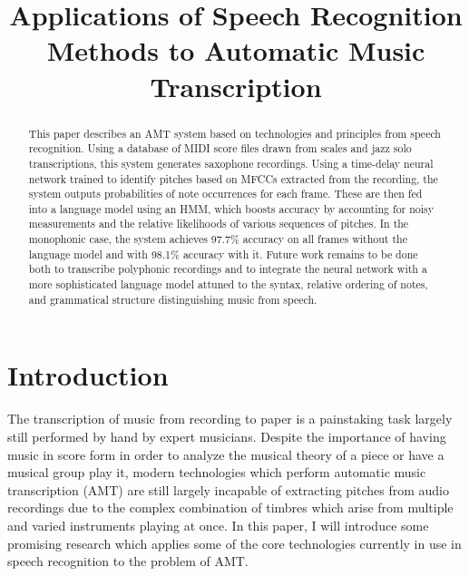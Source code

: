 \documentclass[conference]{IEEEtran}
\begin{document}
\title{Applications of Speech Recognition Methods to Automatic Music Transcription\\
}

\author{
}

\maketitle

\begin{abstract}
This paper describes an AMT system based on technologies and principles from speech recognition. Using a database of MIDI score files drawn from scales and jazz solo transcriptions, this system generates saxophone recordings. Using a time-delay neural network trained to identify pitches based on MFCCs extracted from the recording, the system outputs probabilities of note occurrences for each frame. These are then fed into a language model using an HMM, which boosts accuracy by accounting for noisy measurements and the relative likelihoods of various sequences of pitches. In the monophonic case, the system achieves 97.7\% accuracy on all frames without the language model and with 98.1\% accuracy with it. Future work remains to be done both to transcribe polyphonic recordings and to integrate the neural network with a more sophisticated language model attuned to the syntax, relative ordering of notes, and grammatical structure distinguishing music from speech.
\end{abstract}

\section{Introduction}

The transcription of music from recording to paper is a painstaking task largely still performed by hand by expert musicians. Despite the importance of having music in score form in order to analyze the musical theory of a piece or have a musical group play it, modern technologies which perform automatic music transcription (AMT)  are still largely incapable of extracting pitches from audio recordings due to the complex combination of timbres which arise from multiple and varied instruments playing at once. In this paper, I will introduce some promising research which applies some of the core technologies currently in use in speech recognition to the problem of AMT. 
\end{document}
